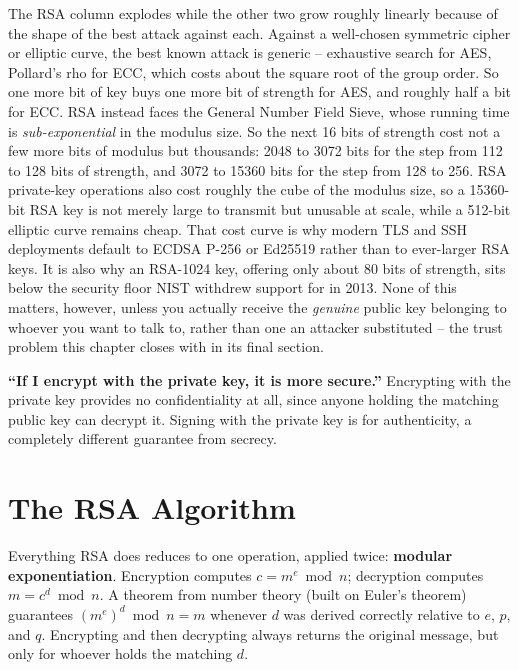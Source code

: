 The RSA column explodes while the other two grow roughly linearly because of the shape of the best
attack against each. Against a well-chosen symmetric cipher or elliptic curve, the best known attack
is generic -- exhaustive search for AES, Pollard's rho for ECC, which costs about the square root of
the group order. So one more bit of key buys one more bit of strength for AES, and roughly half a bit
for ECC. RSA instead faces the General Number Field Sieve, whose running time is
\emph{sub-exponential} in the modulus size. So the next 16 bits of strength cost not a few more bits
of modulus but thousands: 2048 to 3072 bits for the step from 112 to 128 bits of strength, and 3072
to 15360 bits for the step from 128 to 256. RSA private-key operations also cost roughly the cube
of the modulus size, so a 15360-bit RSA key is not merely large to transmit but unusable at scale,
while a 512-bit elliptic curve remains cheap. That cost curve is why modern TLS and SSH deployments
default to ECDSA P-256 or Ed25519 rather than to ever-larger RSA keys. It is also why an RSA-1024
key, offering only about 80 bits of strength, sits below the security floor NIST withdrew support
for in 2013. None of
this matters, however, unless you actually receive the \emph{genuine} public key belonging to whoever
you want to talk to, rather than one an attacker substituted -- the trust problem this chapter closes
with in its final section.

\begin{misconception}
\textbf{``If I encrypt with the private key, it is more secure.''} Encrypting with the private key
provides no confidentiality at all, since anyone holding the matching public key can decrypt it.
Signing with the private key is for authenticity, a completely different guarantee from secrecy.
\end{misconception}

\section{The RSA Algorithm}

Everything RSA does reduces to one operation, applied twice: \textbf{modular exponentiation}.
Encryption computes $c = m^e \bmod n$; decryption computes $m = c^d \bmod n$. A theorem from number
theory (built on Euler's theorem) guarantees $(m^e)^d \bmod n = m$ whenever $d$ was derived correctly
relative to $e$, $p$, and $q$. Encrypting and then decrypting always returns the original message,
but only for whoever holds the matching $d$.

